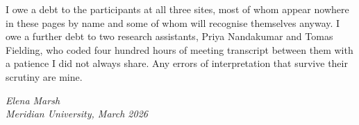 I owe a debt to the participants at all three sites, most of whom appear
nowhere in these pages by name and some of whom will recognise themselves
anyway. I owe a further debt to two research assistants, Priya Nandakumar and
Tomas Fielding, who coded four hundred hours of meeting transcript between
them with a patience I did not always share. Any errors of interpretation
that survive their scrutiny are mine.

\bigskip
\noindent \textit{Elena Marsh}\\
\textit{Meridian University, March 2026}
